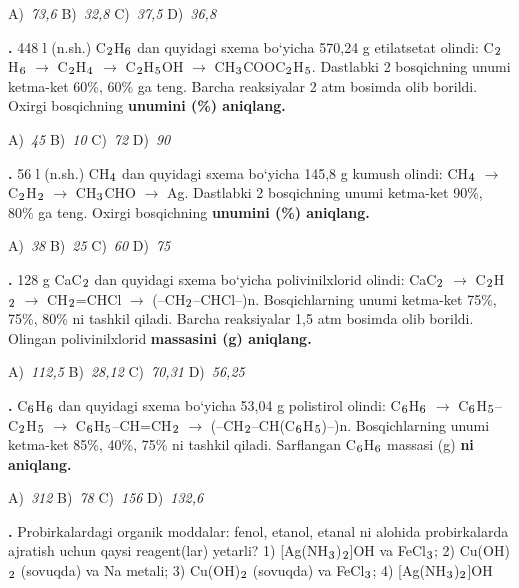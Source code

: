 \documentclass[11pt,a4paper]{article}
\renewcommand{\textsubscript}[1]{\ensuremath{_{\text{\fontsize{8}{8}\selectfont #1}}}}
\newcommand{\qn}[1]{\textbf{\fontsize{11.5}{13}\selectfont #1}}
\newcommand{\qsep}{\par\vspace{13pt}}
\begin{document}
\begin{multicols}{2}
\noindent A)~\textsl{73,6} \hfill B)~\textsl{32,8} \hfill C)~\textsl{37,5} \hfill D)~\textsl{36,8}\par
\qsep
\noindent\qn{26.} 448 l (n.sh.) C\textsubscript{2}H\textsubscript{6} dan quyidagi sxema bo`yicha 570,24 g etilatsetat olindi: C\textsubscript{2}H\textsubscript{6} $\to$ C\textsubscript{2}H\textsubscript{4} $\to$ C\textsubscript{2}H\textsubscript{5}OH $\to$ CH\textsubscript{3}COOC\textsubscript{2}H\textsubscript{5}. Dastlabki 2 bosqichning unumi ketma-ket 60\%, 60\% ga teng. Barcha reaksiyalar 2 atm bosimda olib borildi. Oxirgi bosqichning \textbf{unumini (\%) aniqlang.}

\noindent A)~\textsl{45} \hfill B)~\textsl{10} \hfill C)~\textsl{72} \hfill D)~\textsl{90}\par
\qsep
\noindent\qn{27.} 56 l (n.sh.) CH\textsubscript{4} dan quyidagi sxema bo`yicha 145,8 g kumush olindi: CH\textsubscript{4} $\to$ C\textsubscript{2}H\textsubscript{2} $\to$ CH\textsubscript{3}CHO $\to$ Ag. Dastlabki 2 bosqichning unumi ketma-ket 90\%, 80\% ga teng. Oxirgi bosqichning \textbf{unumini (\%) aniqlang.}

\noindent A)~\textsl{38} \hfill B)~\textsl{25} \hfill C)~\textsl{60} \hfill D)~\textsl{75}\par
\qsep
\noindent\qn{28.} 128 g CaC\textsubscript{2} dan quyidagi sxema bo`yicha polivinilxlorid olindi: CaC\textsubscript{2} $\to$ C\textsubscript{2}H\textsubscript{2} $\to$ CH\textsubscript{2}=CHCl $\to$ (--CH\textsubscript{2}--CHCl--)n. Bosqichlarning unumi ketma-ket 75\%, 75\%, 80\% ni tashkil qiladi. Barcha reaksiyalar 1,5 atm bosimda olib borildi. Olingan polivinilxlorid \textbf{massasini (g) aniqlang.}

\noindent A)~\textsl{112,5} \hfill B)~\textsl{28,12} \hfill C)~\textsl{70,31} \hfill D)~\textsl{56,25}\par
\qsep
\noindent\qn{29.} C\textsubscript{6}H\textsubscript{6} dan quyidagi sxema bo`yicha 53,04 g polistirol olindi: C\textsubscript{6}H\textsubscript{6} $\to$ C\textsubscript{6}H\textsubscript{5}--C\textsubscript{2}H\textsubscript{5} $\to$ C\textsubscript{6}H\textsubscript{5}--CH=CH\textsubscript{2} $\to$ (--CH\textsubscript{2}--CH(C\textsubscript{6}H\textsubscript{5})--)n. Bosqichlarning unumi ketma-ket 85\%, 40\%, 75\% ni tashkil qiladi. Sarflangan C\textsubscript{6}H\textsubscript{6} massasi (g) \textbf{ni aniqlang.}

\noindent A)~\textsl{312} \hfill B)~\textsl{78} \hfill C)~\textsl{156} \hfill D)~\textsl{132,6}\par
\qsep
\noindent\qn{30.} Probirkalardagi organik moddalar: fenol, etanol, etanal ni alohida probirkalarda ajratish uchun qaysi reagent(lar) yetarli? 1) [Ag(NH\textsubscript{3})\textsubscript{2}]OH va FeCl\textsubscript{3}; 2) Cu(OH)\textsubscript{2} (sovuqda) va Na metali; 3) Cu(OH)\textsubscript{2} (sovuqda) va FeCl\textsubscript{3}; 4) [Ag(NH\textsubscript{3})\textsubscript{2}]OH


\end{multicols}
\end{document}
